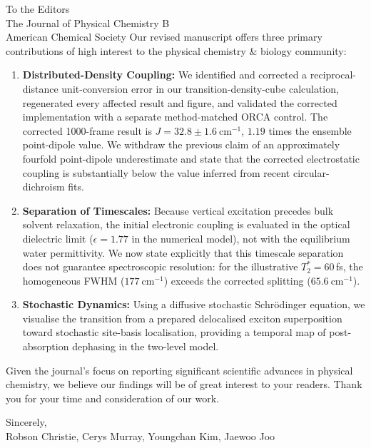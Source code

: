 \documentclass[11pt]{letter}
\begin{document}
\begin{letter}{
    To the Editors \\
    The Journal of Physical Chemistry B \\
    American Chemical Society
}
Our revised manuscript offers three primary contributions of high interest to the physical chemistry \& biology community:
\begin{enumerate}
    \item \textbf{Distributed-Density Coupling:} We identified and corrected a reciprocal-distance unit-conversion error in our transition-density-cube calculation, regenerated every affected result and figure, and validated the corrected implementation with a separate method-matched ORCA control. The corrected 1000-frame result is $J = 32.8 \pm 1.6~\text{cm}^{-1}$, $1.19$ times the ensemble point-dipole value. We withdraw the previous claim of an approximately fourfold point-dipole underestimate and state that the corrected electrostatic coupling is substantially below the value inferred from recent circular-dichroism fits.
    \item \textbf{Separation of Timescales:} Because vertical excitation precedes bulk solvent relaxation, the initial electronic coupling is evaluated in the optical dielectric limit ($\epsilon = 1.77$ in the numerical model), not with the equilibrium water permittivity. We now state explicitly that this timescale separation does not guarantee spectroscopic resolution: for the illustrative $T_2^*=60$\,fs, the homogeneous FWHM ($177~\mathrm{cm^{-1}}$) exceeds the corrected splitting ($65.6~\mathrm{cm^{-1}}$).
    \item \textbf{Stochastic Dynamics:} Using a diffusive stochastic Schrödinger equation, we visualise the transition from a prepared delocalised exciton superposition toward stochastic site-basis localisation, providing a temporal map of post-absorption dephasing in the two-level model.
\end{enumerate}

Given the journal's focus on reporting significant scientific advances in physical chemistry, we believe our findings will be of great interest to your readers. Thank you for your time and consideration of our work.

\medskip
Sincerely,\\
Robson Christie, Cerys Murray, Youngchan Kim, Jaewoo Joo
\end{letter}
\end{document}
